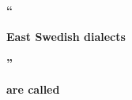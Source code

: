\begin{stylecaption}

\end{stylecaption}

\begin{figure}[h]

\begin{minipage}{5.0839in}

\bfseries
“

\end{minipage}

\end{figure}

\begin{stylecaption}

\end{stylecaption}

\begin{figure}[h]

\begin{minipage}{5.0839in}

\bfseries
East Swedish dialects

\end{minipage}

\end{figure}

\begin{stylecaption}

\end{stylecaption}

\begin{figure}[h]

\begin{minipage}{5.0839in}

\bfseries
”

\end{minipage}

\end{figure}

\begin{stylecaption}

\end{stylecaption}

\begin{figure}[h]

\begin{minipage}{5.0839in}

\bfseries
 are called 

\end{minipage}

\end{figure}

